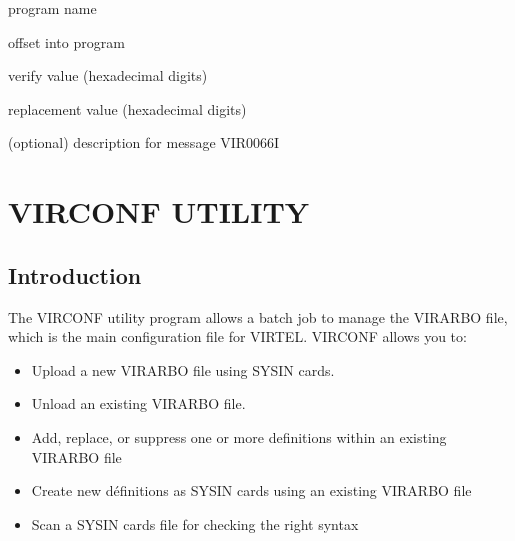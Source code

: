 \documentclass[letterpaper,10pt,english]{sphinxmanual}
\begin{document}
\sphinxAtStartPar
{} \sphinxhyphen{} program name

\sphinxAtStartPar
{} \sphinxhyphen{} offset into program

\sphinxAtStartPar
{} \sphinxhyphen{} verify value (hexadecimal digits)

\sphinxAtStartPar
{} \sphinxhyphen{} replacement value (hexadecimal digits)

\sphinxAtStartPar
{} \sphinxhyphen{} (optional) description for message VIR0066I

\ignorespaces 

\chapter{VIRCONF UTILITY}
\label{\detokenize{Installation_Guide:virconf-utility}}\label{\detokenize{Installation_Guide:index-153}}

\section{Introduction}
\label{\detokenize{Installation_Guide:id9}}
\sphinxAtStartPar
The VIRCONF utility program allows a batch job to manage the VIRARBO file, which is the main configuration file for VIRTEL. VIRCONF allows you to:
\begin{itemize}
\item {} 
\sphinxAtStartPar
Upload a new VIRARBO file using SYSIN cards.

\item {} 
\sphinxAtStartPar
Unload an existing VIRARBO file.

\item {} 
\sphinxAtStartPar
Add, replace, or suppress one or more definitions within an existing VIRARBO file

\item {} 
\sphinxAtStartPar
Create new définitions as SYSIN cards using an existing VIRARBO file

\item {} 
\sphinxAtStartPar
Scan a SYSIN cards file for checking the right syntax

\end{itemize}

\ignorespaces 
\end{document}

